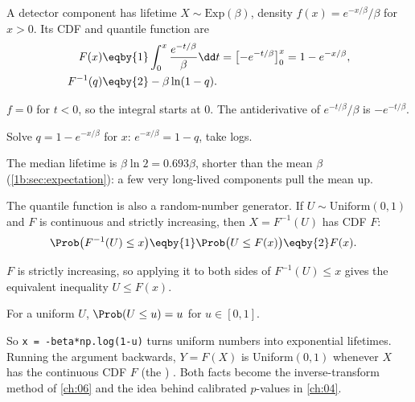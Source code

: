 \label{1b:ex:exp-quantile}
A detector component has lifetime $X\sim\text{Exp}(\beta)$, density
$f(x)=e^{-x/\beta}/\beta$ for $x>0$. Its CDF and quantile function are
\begin{align*}
  F(x)
  &\eqby{1} \int_0^x\frac{e^{-t/\beta}}{\beta}\dd t
   = \bigl[-e^{-t/\beta}\bigr]_0^x
   = 1-e^{-x/\beta},\\
  F^{-1}(q)
  &\eqby{2} -\beta\ln(1-q).
\end{align*}
\begin{explain}
  \item $f=0$ for $t<0$, so the integral starts at 0. The antiderivative of
        $e^{-t/\beta}/\beta$ is $-e^{-t/\beta}$.
  \item Solve $q=1-e^{-x/\beta}$ for $x$: $e^{-x/\beta}=1-q$, take logs.
\end{explain}
The median lifetime is $\beta\ln2=0.693\beta$, shorter than the mean $\beta$
(\cref{1b:sec:expectation}): a few very long-lived components pull the mean up.

The quantile function is also a random-number generator. If
$U\sim\text{Uniform}(0,1)$ and $F$ is continuous and strictly increasing, then
$X=F^{-1}(U)$ has CDF $F$:
\begin{align*}
  \Prob\bigl(F^{-1}(U)\le x\bigr)
  &\eqby{1} \Prob\bigl(U\le F(x)\bigr)
   \eqby{2} F(x).
\end{align*}
\begin{explain}
  \item $F$ is strictly increasing, so applying it to both sides of
        $F^{-1}(U)\le x$ gives the equivalent inequality $U\le F(x)$.
  \item For a uniform $U$, $\Prob(U\le u)=u$ for $u\in[0,1]$.
\end{explain}
So \texttt{x = -beta*np.log(1-u)} turns uniform numbers into exponential
lifetimes. Running the argument backwards, $Y=F(X)$ is Uniform$(0,1)$
whenever $X$ has the continuous CDF $F$ (the ) 
. Both facts become the inverse-transform
method of \cref{ch:06} and the idea behind calibrated $p$-values in
\cref{ch:04}.

